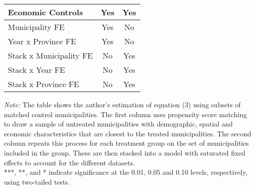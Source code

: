\begin{table}[H]
\begin{threeparttable}
\begin{tabular}[t]{lcc}
Economic Controls & Yes & Yes\\
\midrule
Municipality FE & Yes & No\\
Year x Province FE & Yes & No\\
Stack x Municipality FE & No & Yes\\
Stack x Year FE & No & Yes\\
Stack x Province FE & No & Yes\\
\bottomrule
\end{tabular}
\begin{tablenotes}[para]
\item \footnotesize \textit{Note:} The table shows the author's estimation of equation (3) using subsets of matched control municipalities.
      The first column uses propensity score matching to draw a sample of untreated municipalities with demographic, spatial and economic characteristics
      that are closest to the treated municipalities. The second column repeats this process for each treatment group on the set of municipalities included
      in the group. These are then stacked into a model with saturated fixed effects to account for the different datasets.  \\
      ***, **, and * indicate significance at the 0.01, 0.05 and 0.10 levels, respectively, using two-tailed tests.
\end{tablenotes}
\end{threeparttable}
\end{table}
